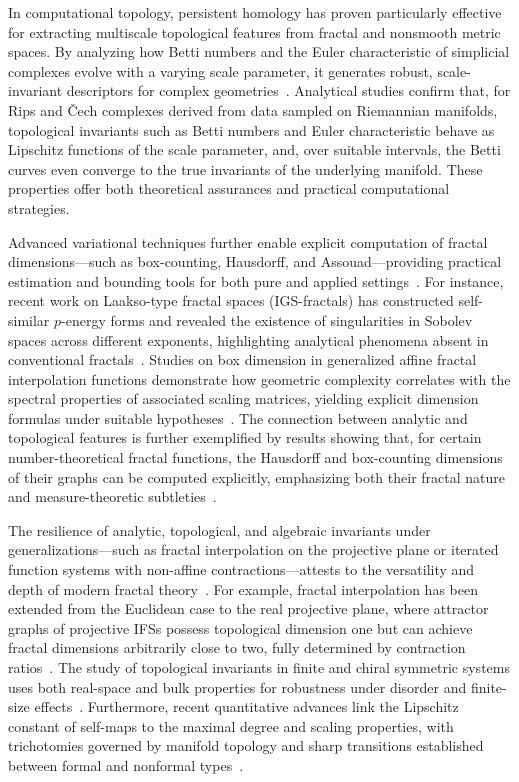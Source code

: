 \documentclass[sigconf]{acmart}
\begin{document}
In computational topology, persistent homology has proven particularly effective for extracting multiscale topological features from fractal and nonsmooth metric spaces. By analyzing how Betti numbers and the Euler characteristic of simplicial complexes evolve with a varying scale parameter, it generates robust, scale-invariant descriptors for complex geometries~\cite{ref88}. Analytical studies confirm that, for Rips and \v{C}ech complexes derived from data sampled on Riemannian manifolds, topological invariants such as Betti numbers and Euler characteristic behave as Lipschitz functions of the scale parameter, and, over suitable intervals, the Betti curves even converge to the true invariants of the underlying manifold. These properties offer both theoretical assurances and practical computational strategies.

Advanced variational techniques further enable explicit computation of fractal dimensions—such as box-counting, Hausdorff, and Assouad—providing practical estimation and bounding tools for both pure and applied settings~\cite{ref13,ref43,ref27}. For instance, recent work on Laakso-type fractal spaces (IGS-fractals) has constructed self-similar $p$-energy forms and revealed the existence of singularities in Sobolev spaces across different exponents, highlighting analytical phenomena absent in conventional fractals~\cite{ref13}. Studies on box dimension in generalized affine fractal interpolation functions demonstrate how geometric complexity correlates with the spectral properties of associated scaling matrices, yielding explicit dimension formulas under suitable hypotheses~\cite{ref28}. The connection between analytic and topological features is further exemplified by results showing that, for certain number-theoretical fractal functions, the Hausdorff and box-counting dimensions of their graphs can be computed explicitly, emphasizing both their fractal nature and measure-theoretic subtleties~\cite{ref27}.

The resilience of analytic, topological, and algebraic invariants under generalizations—such as fractal interpolation on the projective plane or iterated function systems with non-affine contractions—attests to the versatility and depth of modern fractal theory~\cite{ref25,ref28,ref33,ref34}. For example, fractal interpolation has been extended from the Euclidean case to the real projective plane, where attractor graphs of projective IFSs possess topological dimension one but can achieve fractal dimensions arbitrarily close to two, fully determined by contraction ratios~\cite{ref33}. The study of topological invariants in finite and chiral symmetric systems uses both real-space and bulk properties for robustness under disorder and finite-size effects~\cite{ref25}. Furthermore, recent quantitative advances link the Lipschitz constant of self-maps to the maximal degree and scaling properties, with trichotomies governed by manifold topology and sharp transitions established between formal and nonformal types~\cite{ref34}.
\end{document}
